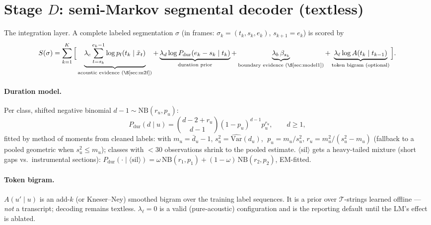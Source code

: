 \documentclass[10pt]{article}
\newcommand{\Tok}{\mathcal{T}}
\newcommand{\NB}{\mathrm{NB}}
\newcommand{\sil}{\langle\mathrm{sil}\rangle}
\begin{document}
\section{Stage $D$: semi-Markov segmental decoder (textless)}\label{sec:decoder}

The integration layer. A complete labeled segmentation $\sigma$ (in frames: $\sigma_k = (t_k, s_k, e_k)$, $s_{k+1} = e_k$) is scored by
\begin{equation}
S(\sigma) = \sum_{k=1}^{K} \Big[
\underbrace{\lambda_c \sum_{t=s_k}^{e_k-1} \log p_{\mathrm{f}}(t_k \mid \tilde x_t)}_{\text{acoustic evidence (\S\ref{sec:m2f})}}
+ \underbrace{\lambda_d \log P_{\mathrm{dur}}(e_k - s_k \mid t_k)}_{\text{duration prior}}
+ \underbrace{\lambda_b\, \beta_{s_k}}_{\text{boundary evidence (\S\ref{sec:model1})}}
+ \underbrace{\lambda_\ell \log A(t_k \mid t_{k-1})}_{\text{token bigram (optional)}}
\Big].
\label{eq:score}
\end{equation}

\paragraph{Duration model.} Per class, shifted negative binomial $d - 1 \sim \NB(r_u, p_u)$:
\begin{equation}
P_{\mathrm{dur}}(d \mid u) = \binom{d-2+r_u}{d-1} (1-p_u)^{d-1} p_u^{r_u}, \qquad d \ge 1,
\end{equation}
fitted by method of moments from cleaned labels: with $m_u = \bar d_u - 1$, $s_u^2 = \widehat{\mathrm{Var}}(d_u)$, $\;p_u = m_u / s_u^2$, $r_u = m_u^2/(s_u^2 - m_u)$ (fallback to a pooled geometric when $s_u^2 \le m_u$); classes with $< 30$ observations shrink to the pooled estimate. $\sil$ gets a heavy-tailed mixture (short gaps vs.\ instrumental sections): $P_{\mathrm{dur}}(\cdot \mid \sil) = \omega\,\NB(r_1,p_1) + (1-\omega)\,\NB(r_2,p_2)$, EM-fitted.

\paragraph{Token bigram.} $A(u' \mid u)$ is an add-$k$ (or Kneser--Ney) smoothed bigram over the training label sequences. It is a prior over $\Tok$-strings learned offline --- \emph{not} a transcript; decoding remains textless. $\lambda_\ell = 0$ is a valid (pure-acoustic) configuration and is the reporting default until the LM's effect is ablated.
\end{document}
